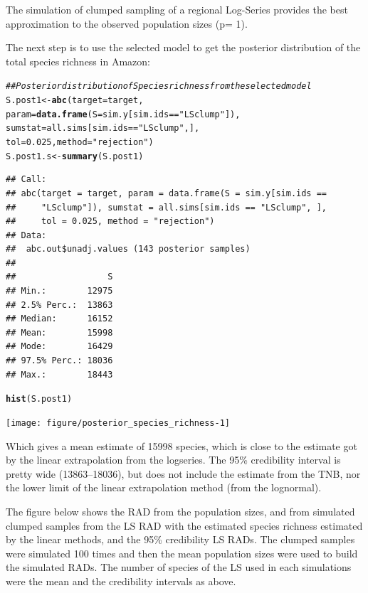 \documentclass[12pt, A4]{article}\usepackage[]{graphicx}\usepackage[]{color}
\makeatletter
\newcommand{\hlnum}[1]{\textcolor[rgb]{0.686,0.059,0.569}{#1}}%
\newcommand{\hlstr}[1]{\textcolor[rgb]{0.192,0.494,0.8}{#1}}%
\newcommand{\hlcom}[1]{\textcolor[rgb]{0.678,0.584,0.686}{\textit{#1}}}%
\newcommand{\hlopt}[1]{\textcolor[rgb]{0,0,0}{#1}}%
\newcommand{\hlstd}[1]{\textcolor[rgb]{0.345,0.345,0.345}{#1}}%
\newcommand{\hlkwb}[1]{\textcolor[rgb]{0.69,0.353,0.396}{#1}}%
\newcommand{\hlkwc}[1]{\textcolor[rgb]{0.333,0.667,0.333}{#1}}%
\newcommand{\hlkwd}[1]{\textcolor[rgb]{0.737,0.353,0.396}{\textbf{#1}}}%
\newenvironment{kframe}{%
 \def\at@end@of@kframe{}%
 \ifinner\ifhmode%
  \def\at@end@of@kframe{\end{minipage}}%
  \begin{minipage}{\columnwidth}%
 \fi\fi%
 \def\FrameCommand##1{\hskip\@totalleftmargin \hskip-\fboxsep
 \colorbox{shadecolor}{##1}\hskip-\fboxsep
     \hskip-\linewidth \hskip-\@totalleftmargin \hskip\columnwidth}%
 \MakeFramed {\advance\hsize-\width
   \@totalleftmargin\z@ \linewidth\hsize
   \@setminipage}}%
 {\par\unskip\endMakeFramed%
 \at@end@of@kframe}
\newenvironment{knitrout}{}{} %
\makeatother
\begin{document}
The simulation of clumped sampling of a regional Log-Series 
provides the best approximation to the observed population sizes
(p= 1).

The next step is to use the selected model to get the
posterior distribution of the total species richness
in Amazon:

\begin{knitrout}
\color{fgcolor}\begin{kframe}
\begin{alltt}
\hlcom{## Posterior distribution of Species richness from the selected model}
\hlstd{S.post1} \hlkwb{<-} \hlkwd{abc}\hlstd{(}\hlkwc{target} \hlstd{= target,}
               \hlkwc{param}\hlstd{=}\hlkwd{data.frame}\hlstd{(}\hlkwc{S}\hlstd{=sim.y[sim.ids}\hlopt{==}\hlstr{"LSclump"}\hlstd{]),}
               \hlkwc{sumstat} \hlstd{= all.sims[sim.ids}\hlopt{==}\hlstr{"LSclump"}\hlstd{,],}
               \hlkwc{tol}\hlstd{=}\hlnum{0.025}\hlstd{,} \hlkwc{method}\hlstd{=}\hlstr{"rejection"}\hlstd{)}
\hlstd{S.post1.s} \hlkwb{<-} \hlkwd{summary}\hlstd{(S.post1)}
\end{alltt}
\begin{verbatim}
## Call: 
## abc(target = target, param = data.frame(S = sim.y[sim.ids == 
##     "LSclump"]), sumstat = all.sims[sim.ids == "LSclump", ], 
##     tol = 0.025, method = "rejection")
## Data:
##  abc.out$unadj.values (143 posterior samples)
## 
##                  S
## Min.:        12975
## 2.5% Perc.:  13863
## Median:      16152
## Mean:        15998
## Mode:        16429
## 97.5% Perc.: 18036
## Max.:        18443
\end{verbatim}
\begin{alltt}
\hlkwd{hist}\hlstd{(S.post1)}
\end{alltt}
\end{kframe}

{\centering \texttt{[image: figure/posterior\_species\_richness-1]} 

}



\end{knitrout}

Which gives a mean estimate of 15998 species, which is close to
the estimate got by the linear extrapolation from the logseries.
The 95\% credibility interval is pretty wide 
(13863--18036),
but does not include the estimate from the TNB, nor the lower limit
of the linear extrapolation method (from the lognormal).

The figure below shows the RAD from the population sizes,
and from simulated clumped samples from  the LS RAD with the estimated species richness estimated by the linear methods, 
and the 95\% credibility LS RADs. The clumped samples were simulated 100 times and then the mean population sizes
were used to build the simulated RADs. The number of species of the LS used in each simulations
were the mean and the credibility intervals as above.
\end{document}
